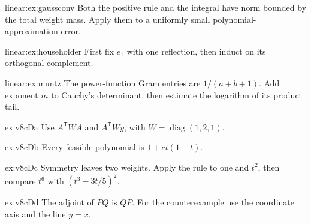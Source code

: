 \begin{hint}{linear:ex:gaussconv}
Both the positive rule and the integral have norm bounded by the total weight mass. Apply them to a uniformly small polynomial-approximation error.
\end{hint}
\begin{hint}{linear:ex:householder}
First fix $e_1$ with one reflection, then induct on its orthogonal complement.
\end{hint}
\begin{hint}{linear:ex:muntz}
The power-function Gram entries are $1/(a+b+1)$. Add exponent $m$ to Cauchy's determinant, then estimate the logarithm of its product tail.
\end{hint}
\begin{hint}{ex:v8cDa}
Use $A^{\mathsf T}WA$ and $A^{\mathsf T}Wy$, with $W=\operatorname{diag}(1,2,1)$.
\end{hint}
\begin{hint}{ex:v8cDb}
Every feasible polynomial is $1+ct(1-t)$.
\end{hint}
\begin{hint}{ex:v8cDc}
Symmetry leaves two weights. Apply the rule to one and $t^2$, then compare $t^6$ with $(t^3-3t/5)^2$.
\end{hint}
\begin{hint}{ex:v8cDd}
The adjoint of $PQ$ is $QP$. For the counterexample use the coordinate axis and the line $y=x$.
\end{hint}

